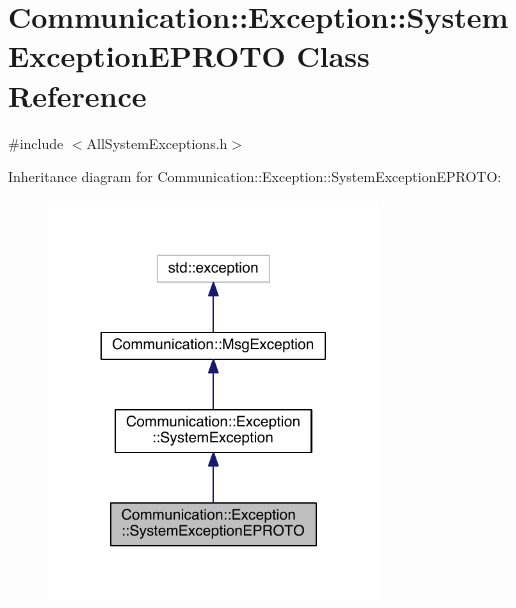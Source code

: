 \hypertarget{class_communication_1_1_exception_1_1_system_exception_e_p_r_o_t_o}{}\section{Communication\+:\+:Exception\+:\+:System\+Exception\+E\+P\+R\+O\+T\+O Class Reference}
\label{class_communication_1_1_exception_1_1_system_exception_e_p_r_o_t_o}


{\ttfamily \#include $<$All\+System\+Exceptions.\+h$>$}



Inheritance diagram for Communication\+:\+:Exception\+:\+:System\+Exception\+E\+P\+R\+O\+T\+O\+:\nopagebreak
\begin{figure}[H]
\begin{center}
\leavevmode
\includegraphics[width=248pt]{class_communication_1_1_exception_1_1_system_exception_e_p_r_o_t_o__inherit__graph}
\end{center}
\end{figure}


